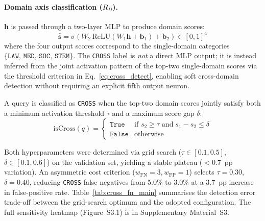 \documentclass[a4paper,fleql]{cas-sc}
\begin{document}
\paragraph{Domain axis classification ($R_D$).}
$\mathbf{h}$ is passed through a two-layer MLP to produce domain scores:
\begin{equation}
    \hat{\mathbf{s}} = \sigma \left( W_2\, \text{ReLU}
    (W_1 \mathbf{h} + \mathbf{b}_1) + \mathbf{b}_2 \right) \in [0,1]^4
    \label{eq:router}
\end{equation}
where the four output scores correspond to the single-domain categories
$\{\texttt{LAW},\, \texttt{MED},\, \texttt{SOC},\, \texttt{STEM}\}$.
The \texttt{CROSS} label is \emph{not} a direct MLP output; it is instead
inferred from the joint activation pattern of the top-two single-domain
scores via the threshold criterion in Eq.~\ref{eq:cross_detect}, enabling
soft cross-domain detection without requiring an explicit fifth output neuron.

A query is classified as \texttt{CROSS} when the top-two domain scores
jointly satisfy both a minimum activation threshold $\tau$ and a maximum
score gap $\delta$:
\begin{equation}
    \text{isCross}(q) =
    \begin{cases}
        \texttt{True}  & \text{if } s_2 \geq \tau \;\text{and}\;
                         s_1 - s_2 \leq \delta \\
        \texttt{False} & \text{otherwise}
    \end{cases}
    \label{eq:cross_detect}
\end{equation}

Both hyperparameters were determined via grid search
($\tau \in [0.1, 0.5]$, $\delta \in [0.1, 0.6]$) on the validation set,
yielding a stable plateau ($<0.7$~pp variation). An asymmetric cost
criterion ($w_{\text{FN}}=3, w_{\text{FP}}=1$) selects
$\tau = 0.30$, $\delta = 0.40$, reducing \texttt{CROSS} false negatives
from 5.0\% to 3.0\% at a 3.7~pp increase in false-positive rate.
Table~\ref{tab:cross_fn_main} summarises the detection error trade-off between
the grid-search optimum and the adopted configuration. The full sensitivity
heatmap (Figure~S3.1) is in Supplementary Material~S3.
\end{document}
